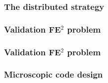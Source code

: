\documentclass[usenames,dvipsnames]{beamer}
\begin{document}

\begin{frame}
\frametitle{The distributed strategy}

\begin{figure}[!ht]
\resizebox{1.0\linewidth}{!}{}
\end{figure}
\end{frame}


\begin{frame}
\frametitle{Validation FE$^2$ problem}
\begin{figure}[!ht]
\resizebox{0.8\linewidth}{!}{}
\end{figure}
\end{frame}


\begin{frame}
\frametitle{Validation FE$^2$ problem}
\begin{figure}[!ht]
\resizebox{1.0\linewidth}{!}{}
\end{figure}
\end{frame}


\begin{frame}
\frametitle{Microscopic code design}

\begin{figure}[!ht]
\end{figure}

\end{frame}
\end{document}
